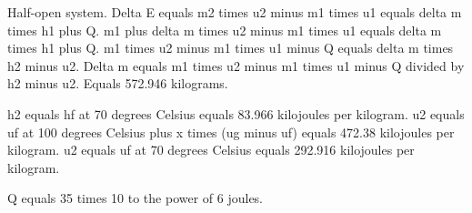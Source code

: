 Half-open system.  
Delta E equals m2 times u2 minus m1 times u1 equals delta m times h1 plus Q.  
m1 plus delta m times u2 minus m1 times u1 equals delta m times h1 plus Q.  
m1 times u2 minus m1 times u1 minus Q equals delta m times h2 minus u2.  
Delta m equals m1 times u2 minus m1 times u1 minus Q divided by h2 minus u2.  
Equals 572.946 kilograms.  

h2 equals hf at 70 degrees Celsius equals 83.966 kilojoules per kilogram.  
u2 equals uf at 100 degrees Celsius plus x times (ug minus uf) equals 472.38 kilojoules per kilogram.  
u2 equals uf at 70 degrees Celsius equals 292.916 kilojoules per kilogram.  

Q equals 35 times 10 to the power of 6 joules.